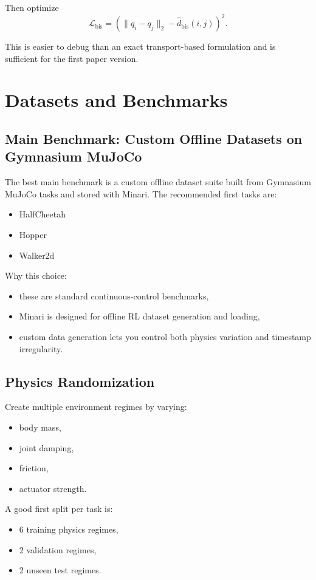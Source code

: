 \documentclass[11pt]{article}
\begin{document}
Then optimize
\[
\mathcal{L}_{\text{bis}} = \left(\lVert q_i - q_j \rVert_2 - \widehat{d}_{\text{bis}}(i,j)\right)^2.
\]

This is easier to debug than an exact transport-based formulation and is sufficient for the first paper version.

\section{Datasets and Benchmarks}

\subsection{Main Benchmark: Custom Offline Datasets on Gymnasium MuJoCo}
The best main benchmark is a custom offline dataset suite built from Gymnasium MuJoCo tasks and stored with Minari. The recommended first tasks are:
\begin{itemize}[leftmargin=1.5em]
    \item HalfCheetah
    \item Hopper
    \item Walker2d
\end{itemize}

Why this choice:
\begin{itemize}[leftmargin=1.5em]
    \item these are standard continuous-control benchmarks,
    \item Minari is designed for offline RL dataset generation and loading,
    \item custom data generation lets you control both physics variation and timestamp irregularity.
\end{itemize}

\subsection{Physics Randomization}
Create multiple environment regimes by varying:
\begin{itemize}[leftmargin=1.5em]
    \item body mass,
    \item joint damping,
    \item friction,
    \item actuator strength.
\end{itemize}

A good first split per task is:
\begin{itemize}[leftmargin=1.5em]
    \item 6 training physics regimes,
    \item 2 validation regimes,
    \item 2 unseen test regimes.
\end{itemize}
\end{document}
